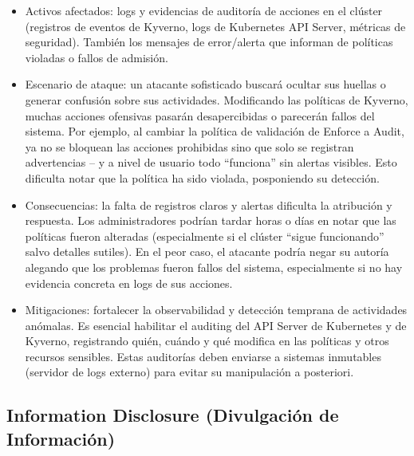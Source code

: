 \documentclass[12pt,twoside,titlepage]{report}
\begin{document}
\begin{itemize}
    \item Activos afectados: logs y evidencias de auditoría de acciones en el clúster (registros de eventos de Kyverno, logs de Kubernetes API Server, métricas de seguridad). También los mensajes de error/alerta que informan de políticas violadas o fallos de admisión.
    \item Escenario de ataque: un atacante sofisticado buscará ocultar sus huellas o generar confusión sobre sus actividades. Modificando las políticas de Kyverno, muchas acciones ofensivas pasarán desapercibidas o parecerán fallos del sistema. Por ejemplo, al cambiar la política de validación de Enforce a Audit, ya no se bloquean las acciones prohibidas sino que solo se registran advertencias – y a nivel de usuario todo “funciona” sin alertas visibles. Esto dificulta notar que la política ha sido violada, posponiendo su detección.
    \item Consecuencias: la falta de registros claros y alertas dificulta la atribución y respuesta. Los administradores podrían tardar horas o días en notar que las políticas fueron alteradas (especialmente si el clúster “sigue funcionando” salvo detalles sutiles). En el peor caso, el atacante podría negar su autoría alegando que los problemas fueron fallos del sistema, especialmente si no hay evidencia concreta en logs de sus acciones.
    \item Mitigaciones: fortalecer la observabilidad y detección temprana de actividades anómalas. Es esencial habilitar el auditing del API Server de Kubernetes y de Kyverno, registrando quién, cuándo y qué modifica en las políticas y otros recursos sensibles. Estas auditorías deben enviarse a sistemas inmutables (servidor de logs externo) para evitar su manipulación a posteriori.
\end{itemize}

\subsection{Information Disclosure (Divulgación de Información)}
\end{document}
